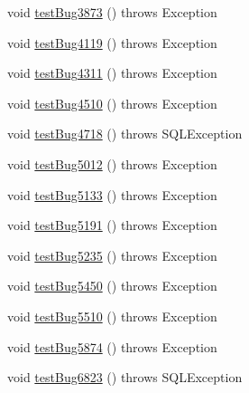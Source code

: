 \begin{DoxyCompactItemize}
\item 
void \mbox{\hyperlink{classtestsuite_1_1regression_1_1_statement_regression_test_ae2a11a2595f18543149eec103cbdab74}{test\+Bug3873}} ()  throws Exception 
\item 
void \mbox{\hyperlink{classtestsuite_1_1regression_1_1_statement_regression_test_aa19f004cf4f8befed3b467cc1c41819b}{test\+Bug4119}} ()  throws Exception 
\item 
void \mbox{\hyperlink{classtestsuite_1_1regression_1_1_statement_regression_test_af83dee9bd9b4ca7c1ab3fefcfbe705b3}{test\+Bug4311}} ()  throws Exception 
\item 
void \mbox{\hyperlink{classtestsuite_1_1regression_1_1_statement_regression_test_aebabf4bfb1e29cff3d9e239fbead766f}{test\+Bug4510}} ()  throws Exception 
\item 
void \mbox{\hyperlink{classtestsuite_1_1regression_1_1_statement_regression_test_a4a5feeaaf1b8fb177b2f026231e14165}{test\+Bug4718}} ()  throws S\+Q\+L\+Exception 
\item 
void \mbox{\hyperlink{classtestsuite_1_1regression_1_1_statement_regression_test_a9fbede1821be869adb354fa18fdc4686}{test\+Bug5012}} ()  throws Exception 
\item 
void \mbox{\hyperlink{classtestsuite_1_1regression_1_1_statement_regression_test_aebe0b100ad408b0b92fc1c55d590e08e}{test\+Bug5133}} ()  throws Exception 
\item 
void \mbox{\hyperlink{classtestsuite_1_1regression_1_1_statement_regression_test_a5ecea80618e2b7c9b6e3f471d5294b64}{test\+Bug5191}} ()  throws Exception 
\item 
void \mbox{\hyperlink{classtestsuite_1_1regression_1_1_statement_regression_test_ac43b204c22e7e37fa98b6bd22e3b18fc}{test\+Bug5235}} ()  throws Exception 
\item 
void \mbox{\hyperlink{classtestsuite_1_1regression_1_1_statement_regression_test_adc6580814eddc4780ccf4e1d6a53b536}{test\+Bug5450}} ()  throws Exception 
\item 
void \mbox{\hyperlink{classtestsuite_1_1regression_1_1_statement_regression_test_ae17fd868257b4ae2a627687f8bdae904}{test\+Bug5510}} ()  throws Exception 
\item 
void \mbox{\hyperlink{classtestsuite_1_1regression_1_1_statement_regression_test_add450cdadfb025367a53db78024a96e6}{test\+Bug5874}} ()  throws Exception 
\item 
void \mbox{\hyperlink{classtestsuite_1_1regression_1_1_statement_regression_test_a56e71fb8ad060f98fe506bef810726c9}{test\+Bug6823}} ()  throws S\+Q\+L\+Exception 

\end{DoxyCompactItemize}
